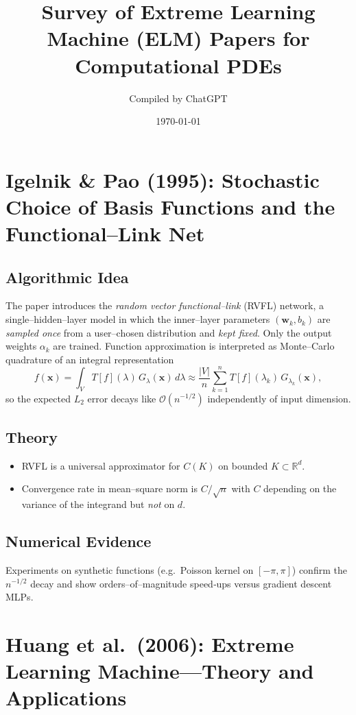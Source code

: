 \documentclass{article}
\title{Survey of Extreme Learning Machine (ELM) Papers for Computational PDEs}
\author{Compiled by ChatGPT}
\date{\today}
\begin{document}
\maketitle

\section{Igelnik \& Pao (1995): Stochastic Choice of Basis Functions and the Functional–Link Net}
\subsection*{Algorithmic Idea}
The paper introduces the \emph{random vector functional–link} (RVFL) network, a single–hidden–layer model in which the inner–layer parameters $(\boldsymbol{w}_k,b_k)$ are \emph{sampled once} from a user–chosen distribution and \emph{kept fixed}.  Only the output weights $\alpha_k$ are trained.  Function approximation is interpreted as Monte–Carlo quadrature of an integral representation
\begin{equation}
f(\boldsymbol x)=\int_V T[f](\lambda)\,G_{\lambda}(\boldsymbol x)\,d\lambda\approx
\frac{|V|}{n}\sum_{k=1}^n T[f](\lambda_k)\,G_{\lambda_k}(\boldsymbol x),
\end{equation}
so the expected $L_2$ error decays like $\mathcal O(n^{-1/2})$ independently of input dimension.

\subsection*{Theory}
\begin{itemize}
\item RVFL is a universal approximator for $C(K)$ on bounded $K\subset\mathbb R^d$.
\item Convergence rate in mean–square norm is $C/\sqrt n$ with $C$ depending on the variance of the integrand but \emph{not} on $d$.
\end{itemize}

\subsection*{Numerical Evidence}
Experiments on synthetic functions (e.g.\ Poisson kernel on $[-\pi,\pi]$) confirm the $n^{-1/2}$ decay and show orders–of–magnitude speed‑ups versus gradient descent MLPs.

\section{Huang et al.\ (2006): Extreme Learning Machine—Theory and Applications}
\end{document}

